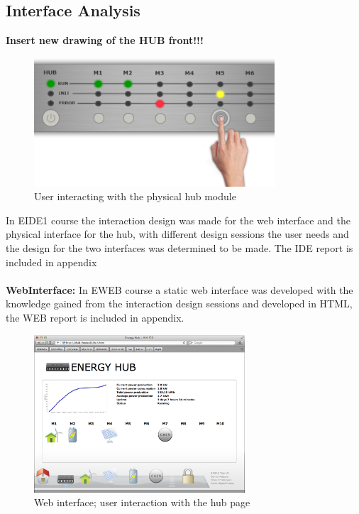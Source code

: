 \subsection{Interface Analysis}
\textbf{\Huge Insert new drawing of the HUB front!!!}
\begin{figure}[H]
	\begin{centering}
		 \includegraphics[width=0.8\textwidth]{images/hub_user_interact.png}
		\caption{User interacting with the physical hub module}
	\end{centering}
\end{figure}
In EIDE1 course the interaction design was made for the web interface and the physical interface for the hub, with different design sessions the user needs and the design for the two interfaces was determined to be made. The IDE report is included in appendix\\
\\\textbf{WebInterface:} In EWEB course a static web interface was developed with the knowledge gained from the interaction design sessions and developed in HTML, the WEB report is included in appendix.
\begin{figure}[H]
	\begin{centering}
		 \includegraphics[width=0.7\textwidth]{images/screen_hub_page.png}
		\caption{Web interface; user interaction with the hub page}
 	\end{centering}
\end{figure}
